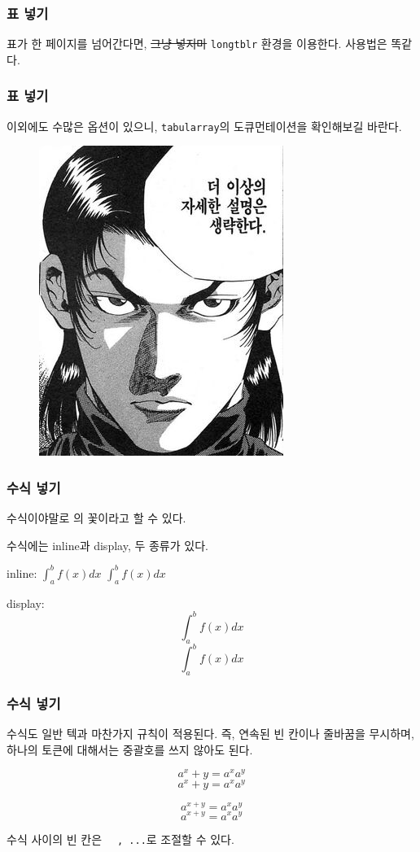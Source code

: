 \documentclass[aspectratio={169}]{beamer}
\begin{document}
\begin{frame}
    \frametitle{표 넣기}

    표가 한 페이지를 넘어간다면, \sout{그냥 넣지마} \texttt{longtblr} 환경을 이용한다. 사용법은 똑같다.

\end{frame}

\begin{frame}
    \frametitle{표 넣기}

    이외에도 수많은 옵션이 있으니, \texttt{tabularray}의 도큐먼테이션을 확인해보길 바란다.

    \begin{figure}
        \centering
        \includegraphics[height=0.7\textheight]{noexplanation.jpg}
    \end{figure}

\end{frame}

\begin{frame}[fragile]
    \frametitle{수식 넣기}

    수식이야말로 \tex{}의 꽃이라고 할 수 있다.

    수식에는 inline과 display, 두 종류가 있다.

    inline: \texttt{$\int_a^b f(x) dx$} $\int_a^b f(x) dx$

    display: \texttt{\[ \int_a^b f(x) dx \]} \[ \int_a^b f(x) dx \]

\end{frame}

\begin{frame}[fragile]
    \frametitle{수식 넣기}

    수식도 일반 텍과 마찬가지 규칙이 적용된다. 즉, 연속된 빈 칸이나 줄바꿈을 무시하며, 하나의 토큰에 대해서는 중괄호를 쓰지 않아도 된다.

    \texttt{\[ a^x+y     = a^xa^y \]}
    \[ a^x+y     = a^xa^y \]

    \texttt{\[ a^{x+y} = a^xa^y \]}
    \[ a^{x+y} = a^xa^y \]

    수식 사이의 빈 칸은 \texttt{\, \quad, ...}로 조절할 수 있다.

\end{frame}
\end{document}
